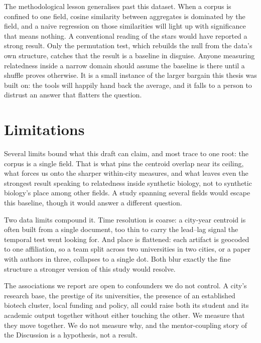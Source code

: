 \documentclass[12pt,a4paper]{article}
\begin{document}
	The methodological lesson generalises past this dataset. When a corpus is confined
	to one field, cosine similarity between aggregates is dominated by the field, and a
	naive regression on those similarities will light up with significance that means
	nothing. A conventional reading of the stars would have reported a strong result.
	Only the permutation test, which rebuilds the null from the data's own structure,
	catches that the result is a baseline in disguise. Anyone measuring relatedness
	inside a narrow domain should assume the baseline is there until a shuffle proves
	otherwise. It is a small instance of the larger bargain this thesis was built on:
	the tools will happily hand back the average, and it falls to a person to distrust
	an answer that flatters the question.
	
	\section{Limitations}
	
	Several limits bound what this draft can claim, and most trace to one root: the
	corpus is a single field. That is what pins the centroid overlap near its ceiling,
	what forces us onto the sharper within-city measures, and what leaves even the
	strongest result speaking to relatedness inside synthetic biology, not to synthetic
	biology's place among other fields. A study spanning several fields would escape
	this baseline, though it would answer a different question.
	
	Two data limits compound it. Time resolution is coarse: a city-year centroid is
	often built from a single document, too thin to carry the lead--lag signal the
	temporal test went looking for. And place is flattened: each artifact is geocoded
	to one affiliation, so a team split across two universities in two cities, or a
	paper with authors in three, collapses to a single dot. Both blur exactly the fine
	structure a stronger version of this study would resolve.
	
	The associations we report are open to confounders we do not control. A city's
	research base, the prestige of its universities, the presence of an established
	biotech cluster, local funding and policy, all could raise both its student and its
	academic output together without either touching the other. We measure that they
	move together. We do not measure why, and the mentor-coupling story of the
	Discussion is a hypothesis, not a result.
	
\end{document}
